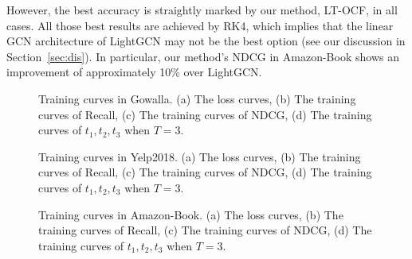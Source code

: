 \documentclass[sigconf]{acmart}
\begin{document}
However, the best accuracy is straightly marked by our method, LT-OCF, in all cases. All those best results are achieved by RK4, which implies that the linear GCN architecture of LightGCN may not be the best option (see our discussion in Section~\ref{sec:dis}). In particular, our method's NDCG in Amazon-Book shows an improvement of approximately 10\% over LightGCN.

\begin{figure}[t]
\centering
{}

\caption{Training curves in Gowalla. (a) The loss curves, (b) The training curves of Recall, (c) The training curves of NDCG, (d) The training curves of $t_1, t_2, t_3$ when $T=3$.} \label{fig:time1}
\end{figure}

\begin{figure}[t]
\centering
{}
\caption{Training curves in Yelp2018. (a) The loss curves, (b) The training curves of Recall, (c) The training curves of NDCG, (d) The training curves of $t_1, t_2, t_3$ when $T=3$.} \label{fig:time2}
\end{figure}

\begin{figure}[t]
\centering
{}
\caption{Training curves in Amazon-Book. (a) The loss curves, (b) The training curves of Recall, (c) The training curves of NDCG, (d) The training curves of $t_1, t_2, t_3$ when $T=3$.} \label{fig:time3}
\end{figure}
\end{document}
